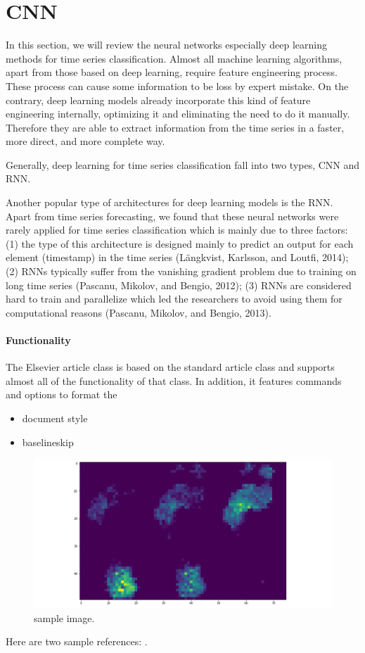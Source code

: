 \section{CNN}
In this section, we will review the neural networks especially deep learning methods for time series classification. 
Almost all machine learning algorithms, apart from those based on deep learning, require feature engineering process. These process can cause some information to be loss by expert mistake. On the contrary, deep learning models already incorporate this kind of feature engineering internally, optimizing it and eliminating the need to do it manually. Therefore they are able to extract information from the time series in a faster, more direct, and more complete way.





Generally, deep learning for time series classification fall into two types, CNN and RNN.

Another popular type of architectures for deep learning models is the RNN. Apart from time series forecasting, we found that these neural networks were rarely applied for time series classification which is mainly due to three factors: (1) the type
of this architecture is designed mainly to predict an output for each element (timestamp) in the time series (Längkvist, Karlsson, and Loutfi, 2014); (2) RNNs typically suffer from the vanishing gradient problem due to training on long time series (Pascanu, Mikolov, and Bengio, 2012); (3) RNNs are considered hard to train
and parallelize which led the researchers to avoid using them for computational reasons (Pascanu, Mikolov, and Bengio, 2013).


\paragraph{Functionality} The Elsevier article class is based on the standard article class and supports almost all of the functionality of that class. In addition, it features commands and options to format the
\begin{itemize}%
\item document style
\item baselineskip
\end{itemize}



\begin{figure}
    \centering
    \begin{minipage}[b]{.5\textwidth}
        \includegraphics[width=\textwidth]{figures/project/frame1.png}
    \end{minipage}
    \caption{sample image.}
    \label{fig:Stepscan_dataset}
\end{figure}


Here are two sample references: \cite{SKazemii/EE6563}.